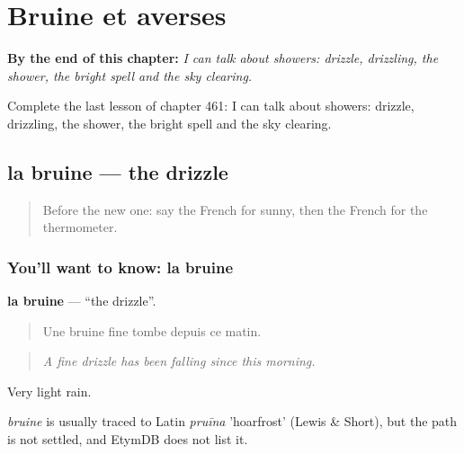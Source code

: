 
\chapter{Bruine et averses}
\label{ch:fr-bruine-et-averses}

\begin{chapteropening}
\textbf{By the end of this chapter:} \emph{I can talk about showers: drizzle, drizzling, the shower, the bright spell and the sky clearing.}

Complete the last lesson of chapter 461: I can talk about showers: drizzle, drizzling, the shower, the bright spell and the sky clearing.
\end{chapteropening}

\section[la bruine]{la bruine — the drizzle}

\label{lesson:FR-C461-bruine}



\begin{quote}
Before the new one: say the French for sunny, then the French for the thermometer.
\end{quote}

\subsection*{You'll want to know: la bruine}
\textbf{la bruine} — \textquotedblleft{}the drizzle\textquotedblright{}.

\begin{quote}
Une bruine fine tombe depuis ce matin.
\end{quote}

\begin{quote}
\emph{A fine drizzle has been falling since this morning.}
\end{quote}

Very light rain.

\begin{cousinweb}
\emph{bruine} is usually traced to Latin \emph{pruīna} 'hoarfrost' (Lewis \& Short), but the path is not settled, and EtymDB does not list it.
\end{cousinweb}

